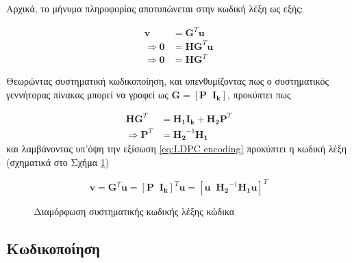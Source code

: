 Αρχικά, το μήνυμα πληροφορίας αποτυπώνεται στην κωδική λέξη ως εξής:

\begin{equation}
\begin{split}
\mathbf{v} &= \mathbf{G}^T\mathbf{u} \\
\Rightarrow \mathbf{0} &= \mathbf{H}\mathbf{G}^T\mathbf{u} \\
\Rightarrow \mathbf{0} &= \mathbf{H}\mathbf{G}^T
\end{split}
\label{eq:LDPC encoding}
\end{equation}

Θεωρώντας συστηματική κωδικοποίηση, και υπενθυμίζοντας πως ο συστηματικός γεννήτορας πίνακας μπορεί να γραφεί ως $\mathbf{G} = \left[\mathbf{P}\;\;\mathbf{I_k}\right]$, προκύπτει πως

\begin{equation}
\begin{split}
\mathbf{H}\mathbf{G}^T &= \mathbf{H_1}\mathbf{I_k} + \mathbf{H_2}\mathbf{P}^T \\
\Rightarrow \mathbf{P}^T &= \mathbf{H_2}^{-1}\mathbf{H_1}
\end{split}
\label{eq:parity part of LDPC}
\end{equation}
και λαμβάνοντας υπ'όψη την εξίσωση \ref{eq:LDPC encoding} προκύπτει η κωδική λέξη (σχηματικά στο Σχήμα \ref{fig:LDPC codeword formation})

\begin{equation}
\mathbf{v} = \mathbf{G}^T\mathbf{u} = \left[\mathbf{P}\;\;\mathbf{I_k}\right]^T\mathbf{u} = \left[\mathbf{u}\;\;\mathbf{H_2}^{-1}\mathbf{H_1}\mathbf{u}\right]^T
\label{eq:LDPC codeword formation}
\end{equation}

\begin{figure}[h]
\caption{Διαμόρφωση συστηματικής κωδικής λέξης  κώδικα}
\label{fig:LDPC codeword formation}
\end{figure}

\subsection{Κωδικοποίηση }

